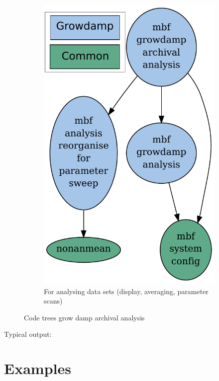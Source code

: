 \documentclass{report}
\begin{document}
\begin{figure}[hbt]
\begin{subfigure}[b]{0.3\textwidth}
        \includegraphics[width=\textwidth]{mbf_growdamp_archival_analysis.pdf}
        \caption{For analysing data sets (display, averaging, parameter scans)}
        \label{fig:growdamp_archiving_analysis}
    \end{subfigure}
    \caption{Code trees grow damp archival analysis}\label{fig:growdamp_archival_code_trees}
\end{figure}

Typical output:


\section{Examples}
\end{document}
